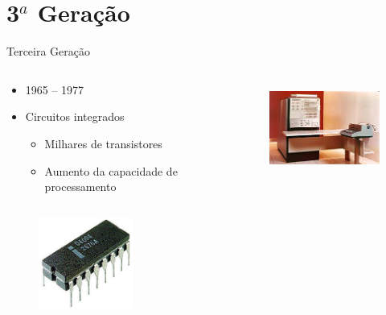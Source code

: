 \documentclass[aspectratio=169,
				xcolor=table]{beamer}
\begin{document}
	\section{3${}^a$ Geração}
	\begin{frame}{Terceira Geração}
		\begin{columns}
			\begin{column}{0.65\textwidth}
			\begin{itemize}
				\item 1965 – 1977
				\vspace{1em}
				\item Circuitos integrados
				\begin{itemize}
					\item Milhares de transistores
					\item Aumento da capacidade de processamento
				\end{itemize}
			\end{itemize}
			\end{column}
			\begin{column}{0.35\textwidth}
				\begin{figure}
					\centering
					\includegraphics[height=3cm, keepaspectratio]{../figs/cap03/geracao31} 			
				\end{figure}
			\end{column}
		\end{columns}
		\vspace{-0.5em}
		\begin{figure}
			\centering
			\includegraphics[height=3cm, keepaspectratio]{../figs/cap03/geracao32} 			
		\end{figure}
	\end{frame}	
	
\end{document}
